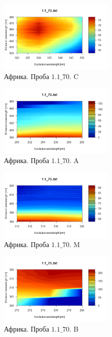 \begin{figure}[!htb]
    \centering
    \includegraphics[width=0.5\textwidth]{fig/Africa_3_C.png}
    \caption{Африка. Проба $1.1\_70$. C}
\end{figure}
\newpage
 \begin{figure}[!htb]
    \centering
    \includegraphics[width=0.5\textwidth]{fig/Africa_3_A.png}
    \caption{Африка. Проба $1.1\_70$. A}
\end{figure}
 \begin{figure}[!htb]
    \centering
    \includegraphics[width=0.5\textwidth]{fig/Africa_3_M.png}
    \caption{Африка. Проба $1.1\_70$. M}
\end{figure}
 \begin{figure}[!htb]
    \centering
    \includegraphics[width=0.5\textwidth]{fig/Africa_3_B.png}
    \caption{Африка. Проба $1.1\_70$. B}
\end{figure}

